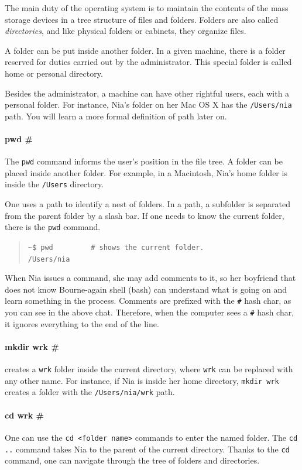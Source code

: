 \documentclass[a4paper,12pt]{book}
\begin{document}
The main duty of the
operating system is to maintain the contents of
the mass storage devices in a tree structure
of files and folders.
Folders are also called {\em directories},
and like physical folders or cabinets,
they organize files.

A folder can be put inside another folder.
In a given machine, there is a folder 
reserved for duties carried out by the
administrator.
This special folder is called home
or personal directory.

Besides the administrator, a machine can
have other rightful users, each with
a personal folder. For instance, Nia's folder
on her Mac OS X has the \verb|/Users/nia|
path. You will learn a more formal
definition of path later on.


\paragraph{pwd \#} 
The \verb|pwd| command informs
the user's position in the file tree.
A folder can be placed
inside another folder.
For example, in a Macintosh, Nia's home
folder is inside the \verb|/Users| directory.

One uses a path to identify
a nest of folders. In a path, a subfolder
is separated from the parent folder
by a slash bar. If one needs to know
the current folder, there is the \verb|pwd|
command. 
\begin{quote}
	\verb|~$ pwd         # shows the current folder. |\\
	\verb|/Users/nia|\\
\end{quote}
When Nia issues a command, she may
add comments to it, so her boyfriend that
does not know Bourne-again shell (bash)
can understand what
is going on and learn something in
the process. Comments are prefixed
with the \verb|#| hash char, as you
can see in the above chat. Therefore,
when the computer sees a \verb|#|
hash char, it ignores everything to
the end of the line.

\paragraph{mkdir wrk \#}
creates a \verb|wrk|
folder inside the current directory,
where \verb|wrk| can be replaced
with any other name.
For instance, if Nia is inside her
home directory, \verb|mkdir wrk| creates
a folder with the \verb|/Users/nia/wrk| path.

\paragraph{cd wrk \#} 
One can use the
\verb|cd <folder name>| commands to enter
the named folder.
The \verb|cd ..|  command
takes Nia to the parent of the current
directory.
Thanks to the \verb|cd|
command, one can navigate through the
tree of folders and directories.
\end{document}
